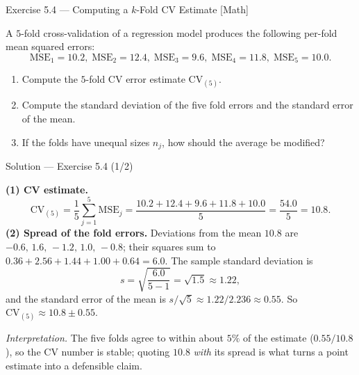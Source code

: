 \documentclass[aspectratio=169,11pt]{beamer}
\begin{document}
\begin{frame}{Exercise 5.4 --- Computing a $k$-Fold CV Estimate [Math]}
  \begin{exercise}
    A $5$-fold cross-validation of a regression model produces the
    following per-fold mean squared errors:
    \[
      \mathrm{MSE}_1 = 10.2,\;
      \mathrm{MSE}_2 = 12.4,\;
      \mathrm{MSE}_3 = 9.6,\;
      \mathrm{MSE}_4 = 11.8,\;
      \mathrm{MSE}_5 = 10.0 .
    \]
    \begin{enumerate}
      \item Compute the $5$-fold CV error estimate $\mathrm{CV}_{(5)}$.
      \item Compute the standard deviation of the five fold errors and
            the standard error of the mean.
      \item If the folds have unequal sizes $n_j$, how should the
            average be modified?
    \end{enumerate}
  \end{exercise}
\end{frame}

\begin{frame}{Solution --- Exercise 5.4 (1/2)}
  \begin{solutionbox}
    \textbf{(1) CV estimate.}
    \[
      \mathrm{CV}_{(5)} = \frac{1}{5}\sum_{j=1}^{5}\mathrm{MSE}_j
      = \frac{10.2+12.4+9.6+11.8+10.0}{5}
      = \frac{54.0}{5} = 10.8 .
    \]
    \textbf{(2) Spread of the fold errors.}
    Deviations from the mean $10.8$ are
    $-0.6,\,1.6,\,-1.2,\,1.0,\,-0.8$; their squares sum to
    $0.36+2.56+1.44+1.00+0.64 = 6.0$. The sample standard deviation is
    \[
      s = \sqrt{\frac{6.0}{5-1}} = \sqrt{1.5} \approx 1.22 ,
    \]
    and the standard error of the mean is
    $s/\sqrt{5} \approx 1.22/2.236 \approx 0.55$.
    So $\mathrm{CV}_{(5)} \approx 10.8 \pm 0.55$.

    \emph{Interpretation.} The five folds agree to within about $5\%$
    of the estimate ($0.55/10.8$), so the CV number is stable; quoting
    $10.8$ \emph{with} its spread is what turns a point estimate into a
    defensible claim.
  \end{solutionbox}
\end{frame}
\end{document}
